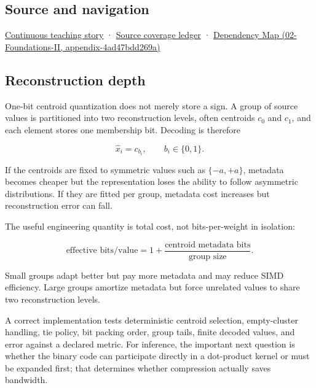 \subsection{Source and navigation}\label{source-and-navigation}

\href{Continuous\%20Notes/Computing\%20Foundations\%20-\%20From\%20Bits\%20to\%20C++\%20and\%20Systems\%20APIs\#Choosing\%20what\%20information\%20to\%20keep}{Continuous teaching story} · \hyperref[appendix-fd090d982a15]{Source coverage ledger} · \href{}{Dependency Map (02-Foundations-II, appendix-4ad47bdd269a)}

\subsection{Reconstruction depth}\label{reconstruction-depth}

One-bit centroid quantization does not merely store a sign. A group of source values is partitioned into two reconstruction levels, often centroids \(c_0\) and \(c_1\), and each element stores one membership bit. Decoding is therefore

\[
\hat x_i = c_{b_i},
\qquad b_i\in\{0,1\}.
\]

If the centroids are fixed to symmetric values such as \(\{-a,+a\}\), metadata becomes cheaper but the representation loses the ability to follow asymmetric distributions. If they are fitted per group, metadata cost increases but reconstruction error can fall.

The useful engineering quantity is total cost, not bits-per-weight in isolation:

\[
\text{effective bits/value}
=
1 + \frac{\text{centroid metadata bits}}{\text{group size}}.
\]

Small groups adapt better but pay more metadata and may reduce SIMD efficiency. Large groups amortize metadata but force unrelated values to share two reconstruction levels.

A correct implementation tests deterministic centroid selection, empty-cluster handling, tie policy, bit packing order, group tails, finite decoded values, and error against a declared metric. For inference, the important next question is whether the binary code can participate directly in a dot-product kernel or must be expanded first; that determines whether compression actually saves bandwidth.
